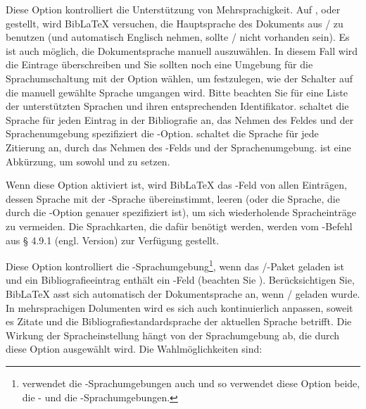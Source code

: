 \documentclass{ltxdockit}[2011/03/25]
\newcommand*{\biblatex}{BibLaTeX\xspace}
\newcommand*{\tabrefe}{\refs{Tabelle}{Tabelle}}
\begin{document}
\begin{optionlist}
Diese Option kontrolliert die Unterstützung von Mehrsprachigkeit. Auf ,  oder  gestellt, wird \biblatex 
versuchen, die Hauptsprache des Dokuments aus
/ zu benutzen (und automatisch Englisch nehmen, 
sollte /
nicht vorhanden sein). Es ist auch möglich, die
Dokumentsprache manuell auszuwählen. In diesem Fall wird 
 die Eintrage überschreiben und Sie sollten noch eine Umgebung für die Sprachumschaltung mit der Option  wählen, um festzulegen, wie der Schalter auf die manuell gewählte Sprache umgangen wird.
Bitte beachten Sie \tabrefe{use:opt:tab1} für
eine Liste der unterstützten Sprachen und ihren entsprechenden Identifikator.
 schaltet die Sprache für jeden Eintrag in der Bibliografie an, das
Nehmen des Feldes  und der Sprachenumgebung spezifiziert
die -Option.  schaltet die Sprache für jede
Zitierung an, durch das Nehmen des -Felds und der
Sprachenumgebung.  
 ist eine Abkürzung,
um sowohl  und  zu setzen. 


Wenn diese Option aktiviert ist, wird \biblatex das -Feld
von allen Einträgen, dessen Sprache mit der -Sprache übereinstimmt,
leeren (oder die Sprache, die durch die -Option genauer
spezifiziert ist), um sich wiederholende Spracheinträge zu vermeiden. Die
Sprachkarten, die dafür benötigt werden, werden vom
-Befehl aus § 4.9.1 
(engl. Version) %
zur Verfügung gestellt.


Diese Option kontrolliert die -Sprachumgebung\footnote{ verwendet die -Sprachumgebungen auch und
so verwendet diese Option beide, die - und die -Sprachumgebungen.}, wenn  das /-Paket geladen ist und ein
Bibliografieeintrag enthält ein -Feld (beachten Sie ). Berücksichtigen Sie, \biblatex asst sich automatisch der Dokumentsprache an, wenn   / geladen wurde. In mehrsprachigen Dolumenten wird es sich auch kontinuierlich anpassen, soweit es Zitate und die Bibliografiestandardsprache der aktuellen Sprache betrifft. Die Wirkung der Spracheinstellung hängt von der Sprachumgebung ab, die durch diese Option ausgewählt
wird. Die Wahlmöglichkeiten sind:


\end{optionlist}
\end{document}
